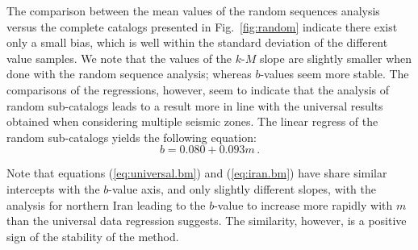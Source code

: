 The comparison between the mean values of the random sequences analysis versus the complete catalogs presented in Fig.~\ref{fig:random} indicate there exist only a small bias, which is well within the standard deviation of the different value samples. We note that the values of the $k$-$M$ slope are slightly smaller when done with the random sequence analysis; whereas $b$-values seem more stable. The comparisons of the regressions, however, seem to indicate that the analysis of random sub-catalogs leads to a result more in line with the universal results obtained when considering multiple seismic zones. The linear regress of the random sub-catalogs yields the following equation:
% 
\begin{equation}
	b = 0.080 + 0.093 m \, .
	\label{eq:iran.bm}
\end{equation}

Note that equations (\ref{eq:universal.bm}) and (\ref{eq:iran.bm}) have share similar intercepts with the $b$-value axis, and only slightly different slopes, with the analysis for northern Iran leading to the $b$-value to increase more rapidly with $m$ than the universal data regression suggests. The similarity, however, is a positive sign of the stability of the method.

